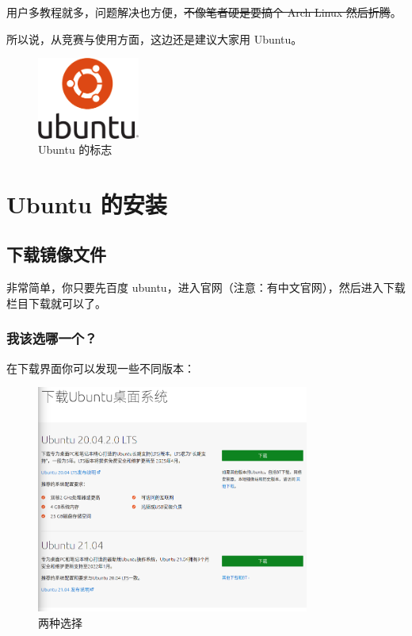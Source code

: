 \documentclass[UTF-8]{ctexart}
\begin{document}
			用户多教程就多，问题解决也方便，\sout{不像笔者硬是要搞个 Arch Linux 然后折腾}。
			
			所以说，从竞赛与使用方面，这边还是建议大家用 Ubuntu。
		
			\begin{figure}[H]
				\centering
				\includegraphics[width=0.3\textwidth]{fig/ubuntu.png}
				\caption*{Ubuntu 的标志}
			\end{figure}
		
	\newpage
	
	\section{Ubuntu 的安装}
	
		\subsection{下载镜像文件}
		
			非常简单，你只要先百度 ubuntu，进入官网（注意：有中文官网），然后进入下载栏目下载就可以了。
			
			\subsubsection{我该选哪一个？}
			
				在下载界面你可以发现一些不同版本：
				
				\begin{figure}[H]
					\centering
					\includegraphics[width=0.8\textwidth]{fig/download_ubuntu_which.png}
					\caption*{两种选择}
				\end{figure}
			
\end{document}
